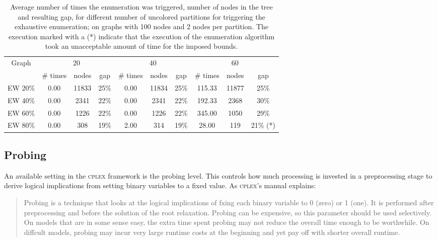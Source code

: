 \begin{table}[h]
\centering

\begin{tabular}{|c|ccc|ccc|ccc|}
\hline
\multicolumn{1}{|c|}{Graph} & \multicolumn{3}{|c|}{20} & \multicolumn{3}{|c|}{40} & \multicolumn{3}{|c|}{60}
\\
 & \# times & nodes & gap & \# times & nodes & gap & \# times & nodes & gap
\\
\hline
EW 20\% & 0.00 & 11833 & 25\% & 0.00 & 11834 & 25\% & 115.33 & 11877 & 25\%
\\
EW 40\%& 0.00 & 2341 & 22\% & 0.00 & 2341 & 22\% & 192.33 & 2368 & 30\%
\\
EW 60\%& 0.00 & 1226 & 22\% & 0.00 & 1226 & 22\% & 345.00 & 1050 & 29\%
\\
EW 80\%& 0.00 & 308 & 19\% & 2.00 & 314 & 19\% & 28.00 & 119 & 21\% (*)
\\
\hline 
 \end{tabular}

\caption{Average number of times the enumeration was triggered, number of nodes in the tree and resulting gap, for different number of uncolored partitions for triggering the exhaustive enumeration; on graphs with 100 nodes and 2 nodes per partition. The execution marked with a (*) indicate that the execution of the enumeration algorithm took an unacceptable amount of time for the imposed bounds.}
\label{table:bnc:prune}

\end{table}

\subsection{Probing}

An available setting in the \textsc{cplex} framework is the probing level. This controls how much processing is invested in a preprocessing stage to derive logical implications from setting binary variables to a fixed value. As \textsc{cplex}'s manual \cite{cplex121} explains:

\begin{quote}

Probing is a technique that looks at the logical implications of fxing each binary variable to 0 (zero) or 1 (one). It is performed after preprocessing and before the solution of the root relaxation. Probing can be expensive, so this parameter should be used selectively. On models that are in some sense easy, the extra time spent probing may not reduce the overall time enough to be worthwhile. On diffcult models, probing may incur very large runtime costs at the beginning and yet pay off with shorter overall runtime. 

\end{quote}


